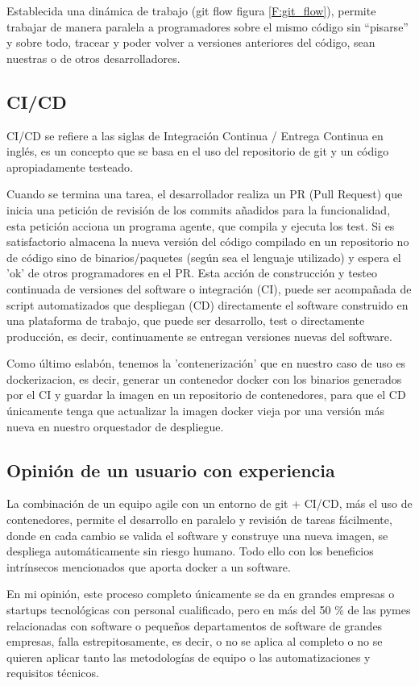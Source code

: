  Establecida una dinámica de trabajo (git flow figura \ref{F:git_flow}), permite trabajar de manera paralela a programadores sobre el mismo código sin “pisarse” y sobre todo, tracear y poder volver a versiones anteriores del código, sean nuestras o de otros desarrolladores.
 
\subsection{CI/CD}
CI/CD se refiere a las siglas de Integración Continua / Entrega Continua en inglés, es un concepto que se basa en el uso del repositorio de git y un código apropiadamente testeado.

Cuando se termina una tarea, el desarrollador realiza un PR (Pull Request) que inicia una petición de revisión de los commits añadidos para la funcionalidad, esta petición acciona un programa agente, que compila y ejecuta los test. Si es satisfactorio almacena la nueva versión del código compilado en un repositorio no de código sino de binarios/paquetes (según sea el lenguaje utilizado) y espera el 'ok' de otros programadores en el PR. Esta acción de construcción y testeo continuada de versiones del software o integración (CI), puede ser acompañada de script automatizados que despliegan (CD) directamente el software construido en una plataforma de trabajo, que puede ser desarrollo, test o directamente producción, es decir, continuamente se entregan versiones nuevas del software.

Como último eslabón, tenemos la 'contenerización' que en nuestro caso de uso es dockerizacion, es decir, generar un contenedor docker con los binarios generados por el CI y guardar la imagen en un repositorio de contenedores, para que el CD únicamente tenga que actualizar la imagen docker vieja por una versión más nueva en nuestro orquestador de despliegue.

\subsection{Opinión de un usuario con experiencia}
La combinación de un equipo agile con un entorno de git + CI/CD, más el uso de contenedores, permite el desarrollo en paralelo y revisión de tareas fácilmente, donde en cada cambio se valida el software y construye una nueva imagen, se despliega automáticamente sin riesgo humano. Todo ello con los beneficios intrínsecos mencionados que aporta docker a un software.

En mi opinión, este proceso completo únicamente se da en grandes empresas o startups tecnológicas con personal cualificado, pero en más del 50 \% de las pymes relacionadas con software o pequeños departamentos de software de grandes empresas, falla estrepitosamente, es decir, o no se aplica al completo o no se quieren aplicar tanto las metodologías de equipo o las automatizaciones y requisitos técnicos.

